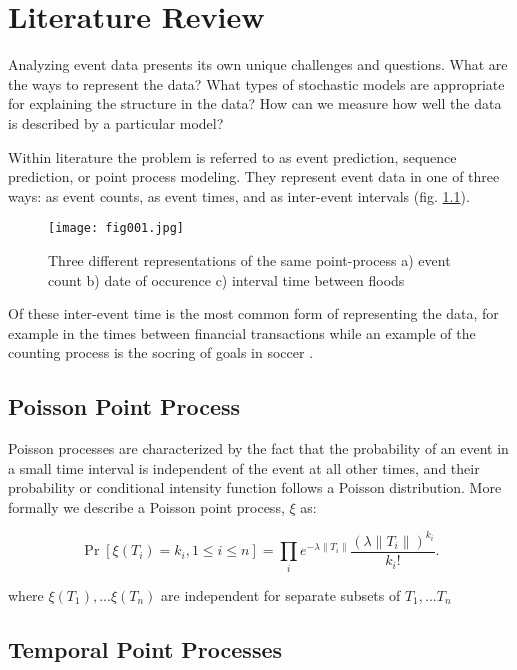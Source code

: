 
\chapter{Literature Review} %


\label{Chapter2} %

Analyzing event data presents its own unique challenges and questions. What are the ways to represent the data?  What types of stochastic 
models  are  appropriate  for  explaining  the  structure  in  the  data? How  can  we  measure  
how  well  the  data  is  described  by  a  particular  model?  

Within literature the problem is referred to as event prediction, sequence prediction, or point process modeling. They represent event data in one of three ways: as event counts, as event times, and as inter-event intervals (fig. \ref{fig:fig1}).

\begin{figure}[h!]
	\texttt{[image: fig001.jpg]}
	\caption{Three different representations of the same point-process a) event count b) date of occurence c) interval time between floods}
	\label{fig:fig1}
\end{figure}

Of these inter-event time is the most common form of representing the data, for example in the times between financial transactions \parencite{EngleRusell} while an example of the counting process is the socring of goals in soccer \parencite{Heuer}. 
 	
\section{Poisson Point Process}

Poisson processes \parencite{Kingman} are characterized by the fact that the probability of an event in a small time interval is independent of the event at all other times, and their probability or conditional intensity function follows a Poisson distribution. More formally we describe a Poisson point process, $\xi$ as:

$$\Pr[\xi (T_{i})=k_{i},1\leq i\leq n]=\prod _{i}e^{{-\lambda \|T_{i}\|}}{\frac  {(\lambda \|T_{i}\|)^{{k_{i}}}}{k_{i}!}}.$$

where $\xi(T_1), ...\xi(T_n)$ are independent for separate subsets of $T_1,...T_n$

\section{Temporal Point Processes}

